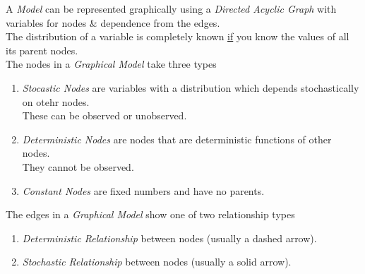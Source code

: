 \documentclass[11pt,a4paper]{article}
\begin{document}
A \textit{Model} can be represented graphically using a \textit{Directed Acyclic Graph} with variables for nodes \& dependence from the edges.\\
The distribution of a variable is completely known \underline{if} you know the values of all its parent nodes.\\
The nodes in a \textit{Graphical Model} take three types
\begin{enumerate}
	\item \textit{Stocastic Nodes} are variables with a distribution which depends stochastically on otehr nodes.\\
These can be observed or unobserved.
	\item \textit{Deterministic Nodes} are nodes that are deterministic functions of other nodes.\\
They cannot be observed.
	\item \textit{Constant Nodes} are fixed numbers and have no parents.
\end{enumerate}
The edges in a \textit{Graphical Model} show one of two relationship types
\begin{enumerate}
	\item \textit{Deterministic Relationship} between nodes (usually a dashed arrow).
	\item \textit{Stochastic Relationship} between nodes (usually a solid arrow).
\end{enumerate}
\end{document}
